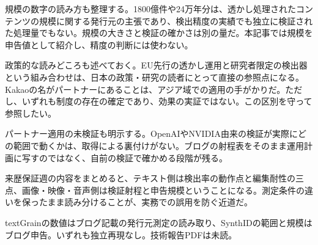 規模の数字の読み方も整理する。1800億件や24万年分は、透かし処理されたコンテンツの規模に関する発行元の主張であり、検出精度の実績でも独立に検証された処理量でもない。規模の大きさと検証の確かさは別の量だ。本記事では規模を申告値として紹介し、精度の判断には使わない。\cite{synthid}

政策的な読みどころも述べておく。EU先行の透かし運用と研究者限定の検出器という組み合わせは、日本の政策・研究の読者にとって直接の参照点になる。Kakaoの名がパートナーにあることは、アジア域での適用の手がかりだ。ただし、いずれも制度の存在の確定であり、効果の実証ではない。この区別を守って参照したい。\cite{textgrain}\cite{synthid}

パートナー適用の未検証も明示する。OpenAIやNVIDIA由来の検証が実際にどの範囲で動くかは、取得による裏付けがない。ブログの射程表をそのまま運用計画に写すのではなく、自前の検証で確かめる段階が残る。\cite{synthid}

来歴保証週の内容をまとめると、テキスト側は検出率の動作点と編集耐性の三点、画像・映像・音声側は検証射程と申告規模ということになる。測定条件の違いを保ったまま読み分けることが、実務での誤用を防ぐ近道だ。\cite{textgrain}\cite{synthid}

\begin{technicalnote}[Note]
textGrainの数値はブログ記載の発行元測定の読み取り、SynthIDの範囲と規模はブログ申告。いずれも独立再現なし。技術報告PDFは未読。
\end{technicalnote}
